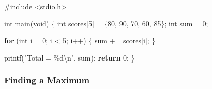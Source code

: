 \documentclass[
  letterpaper,
  DIV=11,
  numbers=noendperiod]{scrreprt}
\newenvironment{Shaded}{\begin{snugshade}}{\end{snugshade}}
\newcommand{\ControlFlowTok}[1]{\textcolor[rgb]{0.00,0.23,0.31}{\textbf{#1}}}
\newcommand{\DataTypeTok}[1]{\textcolor[rgb]{0.68,0.00,0.00}{#1}}
\newcommand{\DecValTok}[1]{\textcolor[rgb]{0.68,0.00,0.00}{#1}}
\newcommand{\ImportTok}[1]{\textcolor[rgb]{0.00,0.46,0.62}{#1}}
\newcommand{\NormalTok}[1]{\textcolor[rgb]{0.00,0.23,0.31}{#1}}
\newcommand{\OperatorTok}[1]{\textcolor[rgb]{0.37,0.37,0.37}{#1}}
\newcommand{\PreprocessorTok}[1]{\textcolor[rgb]{0.68,0.00,0.00}{#1}}
\newcommand{\SpecialCharTok}[1]{\textcolor[rgb]{0.37,0.37,0.37}{#1}}
\newcommand{\StringTok}[1]{\textcolor[rgb]{0.13,0.47,0.30}{#1}}
\begin{document}
\begin{Shaded}
\begin{Highlighting}[]
\PreprocessorTok{\#include }\ImportTok{\textless{}stdio.h\textgreater{}}

\DataTypeTok{int}\NormalTok{ main}\OperatorTok{(}\DataTypeTok{void}\OperatorTok{)} \OperatorTok{\{}
    \DataTypeTok{int}\NormalTok{ scores}\OperatorTok{[}\DecValTok{5}\OperatorTok{]} \OperatorTok{=} \OperatorTok{\{}\DecValTok{80}\OperatorTok{,} \DecValTok{90}\OperatorTok{,} \DecValTok{70}\OperatorTok{,} \DecValTok{60}\OperatorTok{,} \DecValTok{85}\OperatorTok{\};}
    \DataTypeTok{int}\NormalTok{ sum }\OperatorTok{=} \DecValTok{0}\OperatorTok{;}

    \ControlFlowTok{for} \OperatorTok{(}\DataTypeTok{int}\NormalTok{ i }\OperatorTok{=} \DecValTok{0}\OperatorTok{;}\NormalTok{ i }\OperatorTok{\textless{}} \DecValTok{5}\OperatorTok{;}\NormalTok{ i}\OperatorTok{++)} \OperatorTok{\{}
\NormalTok{        sum }\OperatorTok{+=}\NormalTok{ scores}\OperatorTok{[}\NormalTok{i}\OperatorTok{];}
    \OperatorTok{\}}

\NormalTok{    printf}\OperatorTok{(}\StringTok{"Total = }\SpecialCharTok{\%d\textbackslash{}n}\StringTok{"}\OperatorTok{,}\NormalTok{ sum}\OperatorTok{);}
    \ControlFlowTok{return} \DecValTok{0}\OperatorTok{;}
\OperatorTok{\}}
\end{Highlighting}
\end{Shaded}

\subsubsection{Finding a Maximum}\label{finding-a-maximum}
\end{document}
